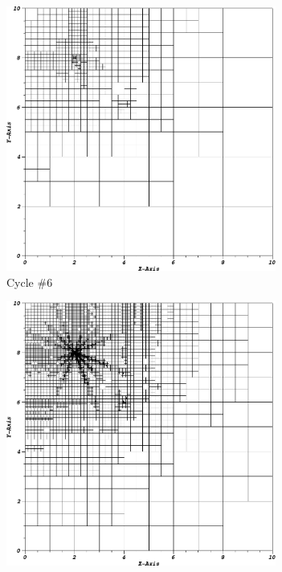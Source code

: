 \begin{figure}
\centering
	\begin{subfigure}[b]{0.485\textwidth}
		\centering
		\includegraphics[width=0.975\textwidth]{figures/sec_DSA/IW_PWLD2_LS4_cyc06.png}
		\caption{Cycle \#6}
	\end{subfigure}
	\hfill
	\begin{subfigure}[b]{0.485\textwidth}
		\centering
		\includegraphics[width=0.975\textwidth]{figures/sec_DSA/IW_PWLD2_LS4_cyc12.png}

\end{subfigure}
\end{figure}
